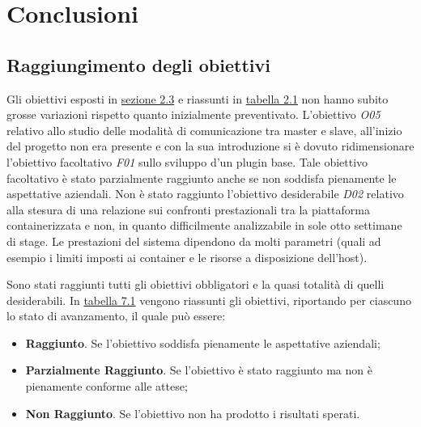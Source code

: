 
\pagestyle{IHA-fancy-style}
\chapter{Conclusioni}
\label{cap:conclusioni}


\section{Raggiungimento degli obiettivi}
\label{sec:obiettivi-raggiunti}

Gli obiettivi esposti in \hyperref[sec:ob]{sezione 2.3} e riassunti in \hyperref[tab:obiettivi-iniziali]{tabella 2.1} non hanno subito grosse variazioni rispetto quanto inizialmente preventivato. L'obiettivo \textit{O05} relativo allo studio delle modalità di comunicazione tra \gls{master} e \gls{slave}, all'inizio del progetto non era presente e con la sua introduzione si è dovuto ridimensionare l'obiettivo facoltativo \textit{F01} sullo sviluppo d'un \gls{plugin} base. Tale obiettivo facoltativo è stato parzialmente raggiunto anche se non soddisfa pienamente le aspettative aziendali. Non è stato raggiunto l'obiettivo desiderabile \textit{D02} relativo alla stesura di una relazione sui confronti prestazionali tra la piattaforma containerizzata e non, in quanto difficilmente analizzabile in sole otto settimane di stage. Le prestazioni del sistema dipendono da molti parametri (quali ad esempio i limiti imposti ai \gls{container} e le risorse a disposizione dell'\gls{host}). 

Sono stati raggiunti tutti gli obiettivi obbligatori e la quasi totalità di quelli desiderabili. In \hyperref[tab:obiettivi-finali]{tabella 7.1} vengono riassunti gli obiettivi, riportando per ciascuno lo stato di avanzamento, il quale può essere:

\begin{itemize}
    \item \textbf{Raggiunto}. Se l'obiettivo soddisfa pienamente le aspettative aziendali;
    \item \textbf{Parzialmente Raggiunto}. Se l'obiettivo è stato raggiunto ma non è pienamente conforme alle attese;
    \item \textbf{Non Raggiunto}. Se l'obiettivo non ha prodotto i risultati sperati.
\end{itemize}


